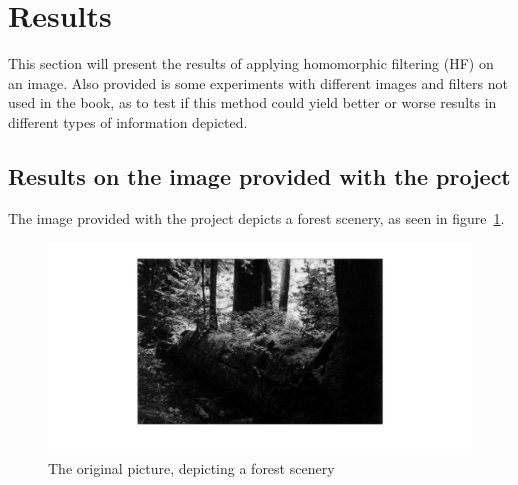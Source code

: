 % 


\section{Results}
	This section will present the results of applying homomorphic filtering (HF)
	on an image. Also provided is some experiments with different images
	and filters not used in the book, as to test if this method could yield
	better or worse results in different types of information depicted.
	\subsection{Results on the image provided with the project}
		The image provided with the project depicts a forest scenery, %
		as seen in figure~\ref{fig:original}.
		\begin{figure}[h!]
			\includegraphics[width=\textwidth]{pics/orig_pic.png}
			\caption{The original picture, depicting a forest scenery}
			\label{fig:original}		
		\end{figure}		
		
		
